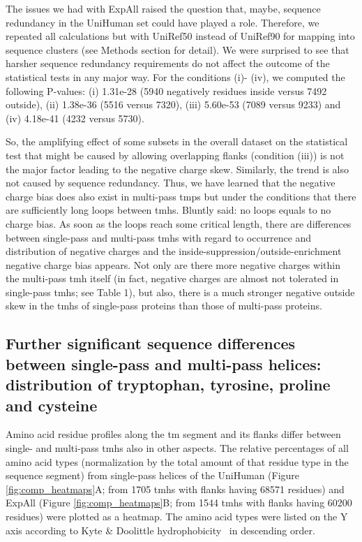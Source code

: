 The issues we had with ExpAll raised the question that, maybe, sequence redundancy in the UniHuman set could have played a role. Therefore, we repeated all calculations but with UniRef50 instead of UniRef90 for mapping into sequence clusters (see Methods section for detail). We were surprised to see that harsher sequence redundancy requirements do not affect the outcome of the statistical tests in any major way. For the conditions (i)- (iv), we computed the following P-values: (i) 1.31e-28 (5940 negatively residues inside versus 7492 outside), (ii) 1.38e-36 (5516 versus 7320), (iii) 5.60e-53 (7089 versus 9233) and (iv) 4.18e-41 (4232 versus 5730).

So, the amplifying effect of some subsets in the overall dataset on the statistical test that might be caused by allowing overlapping flanks (condition (iii)) is not the major factor leading to the negative charge skew. Similarly, the trend is also not caused by sequence redundancy. Thus, we have learned that the negative charge bias does also exist in multi-pass \gls{tmp}s but under the conditions that there are sufficiently long loops between \gls{tmh}s. Bluntly said: no loops equals to no charge bias. As soon as the loops reach some critical length, there are differences between single-pass and multi-pass \gls{tmh}s with regard to occurrence and distribution of negative charges and the inside-suppression/outside-enrichment negative charge bias appears. Not only are there more negative charges within the multi-pass \gls{tmh} itself (in fact, negative charges are almost not tolerated in single-pass \gls{tmh}s; see Table 1), but also, there is a much stronger negative outside skew in the \gls{tmh}s of single-pass proteins than those of multi-pass proteins.

\subsection{Further significant sequence differences between single-pass and multi-pass helices: distribution of tryptophan, tyrosine, proline and cysteine}



Amino acid residue profiles along the \gls{tm} segment and its flanks differ between single- and multi-pass \gls{tmh}s also in other aspects. The relative percentages of all amino acid types (normalization by the total amount of that residue type in the sequence segment) from single-pass helices of the UniHuman (Figure \ref{fig:comp_heatmaps}A; from 1705 \gls{tmh}s with flanks having 68571 residues) and ExpAll (Figure \ref{fig:comp_heatmaps}B; from 1544 \gls{tmh}s with flanks having 60200 residues) were plotted as a heatmap. The amino acid types were listed on the Y axis according to Kyte \& Doolittle hydrophobicity~\cite{Kyte1982} in descending order.

